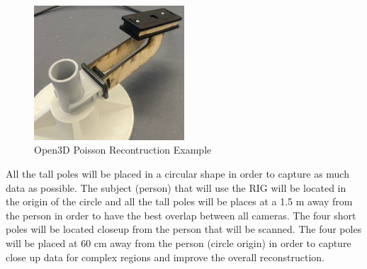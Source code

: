 \documentclass[12pt]{report}
\begin{document}
\begin{figure}[H]
  \hspace*{0.8cm}  
  \includegraphics[width=0.5\textwidth]{IMG_5896_cropped.jpg}
  \captionsetup{singlelinecheck = false, format= hang, justification=raggedright,  labelsep=space}
 \caption{Open3D Poisson Recontruction Example}
 \label{fig:short_pole} 
\end{figure}

All the tall poles will be placed in a circular shape in order to capture as much data as possible. 
The subject (person) that will use the RIG will be located in the origin of the circle and all the tall poles will be places at a 1.5 m away from the person in order to have the best overlap between all cameras.
The four short poles will be located closeup from the person that will be scanned. The four poles will be placed at 60 cm away from the person (circle origin) in order to capture close up data for complex regions and improve the overall reconstruction.
\enlargethispage{\baselineskip}

\newpage
\end{document}
